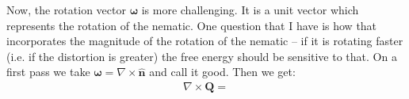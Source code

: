 \documentclass[reqno]{article}
\newcommand{\Q}{\mathbf{Q}}
\newcommand{\bomega}{\boldsymbol{\omega}}
\newcommand{\n}{\mathbf{\hat{n}}}
\begin{document}
Now, the rotation vector $\bomega$ is more challenging. 
It is a unit vector which represents the rotation of the nematic.
One question that I have is how that incorporates the magnitude of the rotation of the nematic -- if it is rotating faster (i.e. if the distortion is greater) the free energy should be sensitive to that.
On a first pass we take $\bomega = \nabla \times \n$ and call it good.
Then we get:
\begin{equation}
\begin{split}
    \nabla \times \Q
    =
\end{split}
\end{equation}
\end{document}
